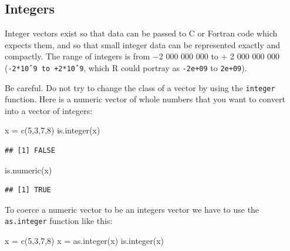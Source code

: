 \documentclass[
]{book}
\newenvironment{Shaded}{\begin{snugshade}}{\end{snugshade}}
\newcommand{\DecValTok}[1]{\textcolor[rgb]{0.00,0.00,0.81}{#1}}
\newcommand{\FunctionTok}[1]{\textcolor[rgb]{0.00,0.00,0.00}{#1}}
\newcommand{\NormalTok}[1]{#1}
\newcommand{\OtherTok}[1]{\textcolor[rgb]{0.56,0.35,0.01}{#1}}
\theoremstyle{definition}
\theoremstyle{definition}
\theoremstyle{definition}
\theoremstyle{definition}
\theoremstyle{remark}
\begin{document}
\hypertarget{integers}{%
\subsection{Integers}\label{integers}}

Integer vectors exist so that data can be passed to C or Fortran code which expects them, and so that small integer data can be represented exactly and compactly. The range of integers is from −2 000 000 000 to + 2 000 000 000 (\texttt{-2*10ˆ9\ to\ +2*10ˆ9}, which R could portray as \texttt{-2e+09} to \texttt{2e+09}).

Be careful. Do not try to change the class of a vector by using the \texttt{integer} function. Here is a numeric vector of whole numbers that you want to convert into a vector of integers:

\begin{Shaded}
\begin{Highlighting}[]
\NormalTok{x }\OtherTok{=} \FunctionTok{c}\NormalTok{(}\DecValTok{5}\NormalTok{,}\DecValTok{3}\NormalTok{,}\DecValTok{7}\NormalTok{,}\DecValTok{8}\NormalTok{)}
\FunctionTok{is.integer}\NormalTok{(x)}
\end{Highlighting}
\end{Shaded}

\begin{verbatim}
## [1] FALSE
\end{verbatim}

\begin{Shaded}
\begin{Highlighting}[]
\FunctionTok{is.numeric}\NormalTok{(x)}
\end{Highlighting}
\end{Shaded}

\begin{verbatim}
## [1] TRUE
\end{verbatim}

To coerce a numeric vector to be an integers vector we have to use the \texttt{as.integer} function like this:

\begin{Shaded}
\begin{Highlighting}[]
\NormalTok{x }\OtherTok{=} \FunctionTok{c}\NormalTok{(}\DecValTok{5}\NormalTok{,}\DecValTok{3}\NormalTok{,}\DecValTok{7}\NormalTok{,}\DecValTok{8}\NormalTok{)}
\NormalTok{x }\OtherTok{=} \FunctionTok{as.integer}\NormalTok{(x)}
\FunctionTok{is.integer}\NormalTok{(x)}
\end{Highlighting}
\end{Shaded}
\end{document}
